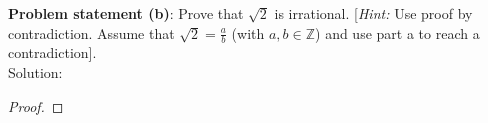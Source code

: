 \documentclass{article} %
\begin{document}
\hfill \break 

\textbf{Problem statement (b)}:  Prove that $\sqrt{2}$ is irrational.  [\textit{Hint:} Use proof by contradiction.  Assume that $\sqrt{2} = \frac{a}{b}$ (with $a,b \in \mathbb{Z}$) and use part {a} to reach a contradiction].
\\

Solution: 
\begin{addmargin}[1em]{0em}
\begin{proof}

\end{proof}
\end{addmargin}

\newpage
\end{document}
